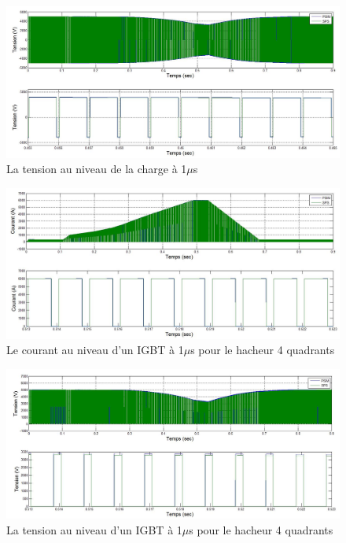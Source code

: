 \documentclass[11pt,letterpaper,final]{report}
\begin{document}
\begin{figure}[htb]
\centering
\includegraphics[scale=0.5]{Fig/Hach_AFE/1u/hach_ten_ch.jpg}
\caption{La tension au niveau de la charge à 1$\mu$s}
\label{AF_HA_CHV1}
\end{figure}

\begin{figure}[htb]
\centering
\includegraphics[scale=0.5]{Fig/Hach_AFE/1u/IGBT_cou_hach.jpg}
\caption{Le courant au niveau d'un IGBT à 1$\mu$s pour le hacheur 4 quadrants}
\label{AF_HA_HAA1}
\end{figure}

\begin{figure}[htb]
\centering
\includegraphics[scale=0.5]{Fig/Hach_AFE/1u/IGBT_ten_hach.jpg}
\caption{La tension au niveau d'un IGBT à 1$\mu$s pour le hacheur 4 quadrants}
\label{AF_HA_HAV1}
\end{figure}
\end{document}
